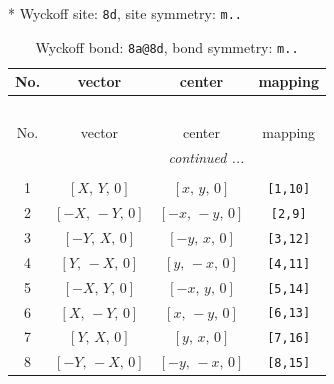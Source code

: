 \documentclass[fleqn,8pt]{jsarticle}
\begin{document}
* Wyckoff site: {\tt 8d}, site symmetry: {\tt m..}
\renewcommand{\arraystretch}{1.2}
\begin{longtable}{cccc}
\caption{Wyckoff bond: {\tt 8a@8d}, bond symmetry: {\tt m..}}
 \\
 \hline \hline
No. & vector & center & mapping \\ \hline \endfirsthead

\multicolumn{3}{l}{\tablename\ \thetable{}} \\
 \hline \hline
No. & vector & center & mapping \\ \hline \endhead

 \hline \hline
\multicolumn{3}{r}{\footnotesize\it continued ...} \\ \endfoot

 \hline \hline
\multicolumn{3}{r}{} \\ \endlastfoot

1 & $\left[ X,\, Y,\, 0 \right]$ & $\left[ x,\, y,\, 0 \right]$ & {\tt [1,10]} \\ \hline
2 & $\left[ - X,\, - Y,\, 0 \right]$ & $\left[ - x,\, - y,\, 0 \right]$ & {\tt [2,9]} \\ \hline
3 & $\left[ - Y,\, X,\, 0 \right]$ & $\left[ - y,\, x,\, 0 \right]$ & {\tt [3,12]} \\ \hline
4 & $\left[ Y,\, - X,\, 0 \right]$ & $\left[ y,\, - x,\, 0 \right]$ & {\tt [4,11]} \\ \hline
5 & $\left[ - X,\, Y,\, 0 \right]$ & $\left[ - x,\, y,\, 0 \right]$ & {\tt [5,14]} \\ \hline
6 & $\left[ X,\, - Y,\, 0 \right]$ & $\left[ x,\, - y,\, 0 \right]$ & {\tt [6,13]} \\ \hline
7 & $\left[ Y,\, X,\, 0 \right]$ & $\left[ y,\, x,\, 0 \right]$ & {\tt [7,16]} \\ \hline
8 & $\left[ - Y,\, - X,\, 0 \right]$ & $\left[ - y,\, - x,\, 0 \right]$ & {\tt [8,15]} \\
\end{longtable}
\renewcommand{\arraystretch}{1.2}
\end{document}
